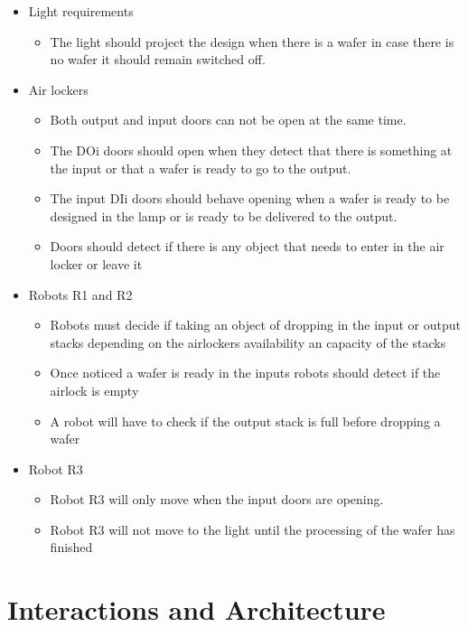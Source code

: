 \documentclass[twocolumn]{article}
\begin{document}
\begin{itemize}
\item Light requirements
\begin{itemize}
\item{The light should project the design  when there is a wafer in case there is no wafer it should remain switched off.}
\end{itemize}
\item Air lockers

\begin{itemize}
\item{Both output and input doors can not be open at the same time.}
\item{The  DOi doors should open when they detect that there is something at the input or that a wafer is ready to go to the output.}
\item{The input DIi doors should behave  opening when a wafer is ready to be designed in the lamp or is ready to be delivered to the output. }
\item{Doors should detect if there is any object that needs to enter in the air locker or leave it}

\end{itemize}
\item Robots R1 and R2
\begin{itemize}
\item {Robots must decide if taking an object of dropping in the input or output stacks depending on the airlockers availability an capacity of the stacks}
\item {Once noticed a wafer is  ready in the inputs robots should detect if the airlock is empty}
\item{A robot will have to check if the output stack is full before dropping a wafer}

\end{itemize}
\item Robot R3
\begin{itemize}
\item {Robot R3 will only move when the input doors are opening.}
\item {Robot R3 will not move to the light until the processing of the wafer has finished}
\end{itemize}
\end{itemize}



\section{Interactions and Architecture}
\end{document}
